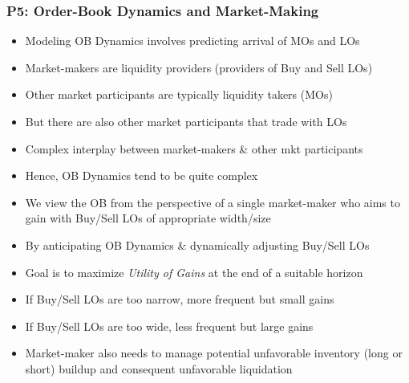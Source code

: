 \documentclass[handout]{beamer}
\begin{document}
\begin{frame}
\frametitle{P5: Order-Book Dynamics and Market-Making}
\pause
\begin{itemize}[<+->]
\item Modeling OB Dynamics involves predicting arrival of MOs and LOs
\item Market-makers are liquidity providers (providers of Buy and Sell LOs)
\item Other market participants are typically liquidity takers (MOs)
\item But there are also other market participants that trade with LOs
\item Complex interplay between market-makers \& other mkt participants
\item Hence, OB Dynamics tend to be quite complex
\item We view the OB from the perspective of a single market-maker who aims to gain with Buy/Sell LOs of appropriate width/size
\item By anticipating OB Dynamics \& dynamically adjusting Buy/Sell LOs
\item Goal is to maximize {\em Utility of Gains} at the end of a suitable horizon
\item If Buy/Sell LOs are too narrow, more frequent but small gains
\item If Buy/Sell LOs are too wide, less frequent but large gains
\item Market-maker also needs to manage potential unfavorable inventory (long or short) buildup and consequent unfavorable liquidation
\end{itemize}
\end{frame}
\end{document}

